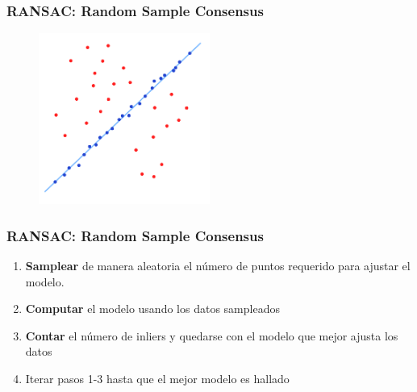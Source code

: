 \begin{frame}
	\frametitle{RANSAC: Random Sample Consensus}
	\footnotesize
	
	
	\begin{figure}
		\includegraphics[width=0.5\textwidth]{./images/ransac_fitted_line.pdf}
	\end{figure}
	
\end{frame}
\begin{frame}
	\frametitle{RANSAC: Random Sample Consensus}
	\footnotesize

	\begin{enumerate}
		\item {\bf Samplear} de manera aleatoria el número de puntos requerido para ajustar el modelo.
		\item {\bf Computar} el modelo usando los datos sampleados
		\item {\bf Contar} el número de inliers y quedarse con el modelo que mejor ajusta los datos
		\item Iterar pasos 1-3 hasta que el mejor modelo es hallado
	\end{enumerate}

\end{frame}

